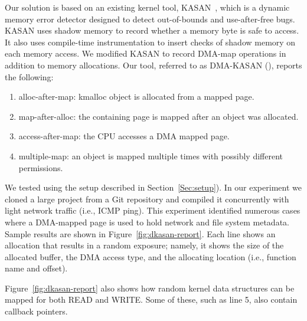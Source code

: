 Our solution is based on an existing kernel tool, KASAN~\cite{kasan}, which is a dynamic memory error detector designed to detect out-of-bounds and use-after-free bugs. KASAN uses shadow memory to record whether a memory byte is safe to access. It also uses compile-time instrumentation to insert checks of shadow memory on each memory access. 
We modified KASAN to record DMA-map operations in addition to memory allocations. Our tool, referred to as DMA-KASAN (\dkasan), reports the following: 
\begin{enumerate}
    \item alloc-after-map:  kmalloc object is allocated from a mapped page.
    \item map-after-alloc:  the containing page is mapped after an object was allocated.
    \item access-after-map: the CPU accesses a DMA mapped page.
    \item multiple-map: an object is mapped multiple times with possibly different permissions.
\end{enumerate}
We tested \dkasan using the setup described in Section~\ref{Sec:setup}).
In our experiment we cloned a large project from a Git repository and compiled it concurrently with light network traffic (i.e., ICMP ping). This experiment identified numerous cases where a DMA-mapped page is used to hold network and file system metadata. Sample results are shown in Figure~\ref{fig:dkasan-report}. Each line shows an allocation that results in a random exposure; namely, it shows the size of the allocated buffer, the DMA access type, and the allocating location (i.e., function name and offset).

Figure~\ref{fig:dkasan-report} also shows how random kernel data structures can be mapped for both READ and WRITE. Some of these, such as line 5, also contain callback pointers. 
 
